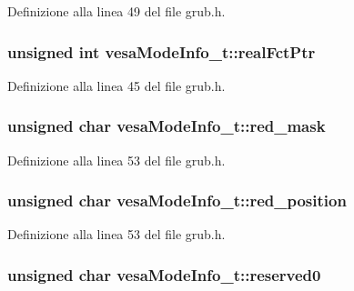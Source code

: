 Definizione alla linea 49 del file grub.\+h.

\hypertarget{structvesaModeInfo__t_a3c3c1fa91bfb8ec58a80ff0b9c1deaae}{
\subsubsection[{real\+Fct\+Ptr}]{\setlength{\rightskip}{0pt plus 5cm}unsigned int vesa\+Mode\+Info\+\_\+t\+::real\+Fct\+Ptr}}\label{structvesaModeInfo__t_a3c3c1fa91bfb8ec58a80ff0b9c1deaae}


Definizione alla linea 45 del file grub.\+h.

\hypertarget{structvesaModeInfo__t_a653392718e3a3c21aad77d0236ec8929}{
\subsubsection[{red\+\_\+mask}]{\setlength{\rightskip}{0pt plus 5cm}unsigned char vesa\+Mode\+Info\+\_\+t\+::red\+\_\+mask}}\label{structvesaModeInfo__t_a653392718e3a3c21aad77d0236ec8929}


Definizione alla linea 53 del file grub.\+h.

\hypertarget{structvesaModeInfo__t_a96ecd4368bbcf68b97c9496939069c55}{
\subsubsection[{red\+\_\+position}]{\setlength{\rightskip}{0pt plus 5cm}unsigned char vesa\+Mode\+Info\+\_\+t\+::red\+\_\+position}}\label{structvesaModeInfo__t_a96ecd4368bbcf68b97c9496939069c55}


Definizione alla linea 53 del file grub.\+h.

\hypertarget{structvesaModeInfo__t_a0f912afd0a853ea123ad3a157fc579c9}{
\subsubsection[{reserved0}]{\setlength{\rightskip}{0pt plus 5cm}unsigned char vesa\+Mode\+Info\+\_\+t\+::reserved0}}\label{structvesaModeInfo__t_a0f912afd0a853ea123ad3a157fc579c9}


